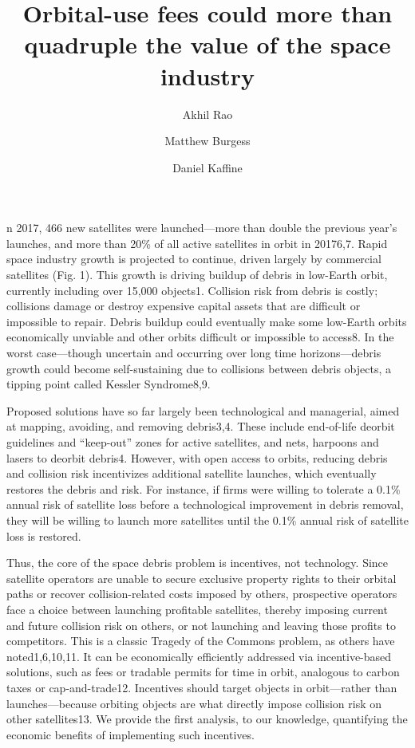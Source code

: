 \documentclass[9pt,twocolumn,twoside,lineno]{pnas-new}
\title{Orbital-use fees could more than quadruple the value of the space industry}
\author[a]{Akhil Rao}
\author[b,c,d]{Matthew Burgess}
\author[d]{Daniel Kaffine}
\affil[a]{Department of Economics, Middlebury College}
\affil[b]{Cooperative Institute for Research in Environmental Sciences, University of Colorado Boulder}
\affil[c]{Environmental Studies Program, University of Colorado Boulder}
\affil[d]{Department of Economics, University of Colorado Boulder}
\begin{document}
\maketitle
\thispagestyle{firststyle}

n 2017, 466 new satellites were launched—more than double the previous year’s launches, and more than 20\% of all active satellites in orbit in 20176,7. Rapid space industry growth is projected to continue, driven largely by commercial satellites (Fig. 1). This growth is driving buildup of debris in low-Earth orbit, currently including over 15,000 objects1. Collision risk from debris is costly; collisions damage or destroy expensive capital assets that are difficult or impossible to repair. Debris buildup could eventually make some low-Earth orbits economically unviable and other orbits difficult or impossible to access8. In the worst case—though uncertain and occurring over long time horizons—debris growth could become self-sustaining due to collisions between debris objects, a tipping point called Kessler Syndrome8,9. 

Proposed solutions have so far largely been technological and managerial, aimed at mapping, avoiding, and removing debris3,4. These include end-of-life deorbit guidelines and “keep-out” zones for active satellites, and nets, harpoons and lasers to deorbit debris4. However, with open access to orbits, reducing debris and collision risk incentivizes additional satellite launches, which eventually restores the debris and risk. For instance, if firms were willing to tolerate a 0.1\% annual risk of satellite loss before a technological improvement in debris removal, they will be willing to launch more satellites until the 0.1\% annual risk of satellite loss is restored. 

Thus, the core of the space debris problem is incentives, not technology. Since satellite operators are unable to secure exclusive property rights to their orbital paths or recover collision-related costs imposed by others, prospective operators face a choice between launching profitable satellites, thereby imposing current and future collision risk on others, or not launching and leaving those profits to competitors.  This is a classic Tragedy of the Commons problem, as others have noted1,6,10,11. It can be economically efficiently addressed via incentive-based solutions, such as fees or tradable permits for time in orbit, analogous to carbon taxes or cap-and-trade12. Incentives should target objects in orbit—rather than launches—because orbiting objects are what directly impose collision risk on other satellites13. We provide the first analysis, to our knowledge, quantifying the economic benefits of implementing such incentives. 
\end{document}
